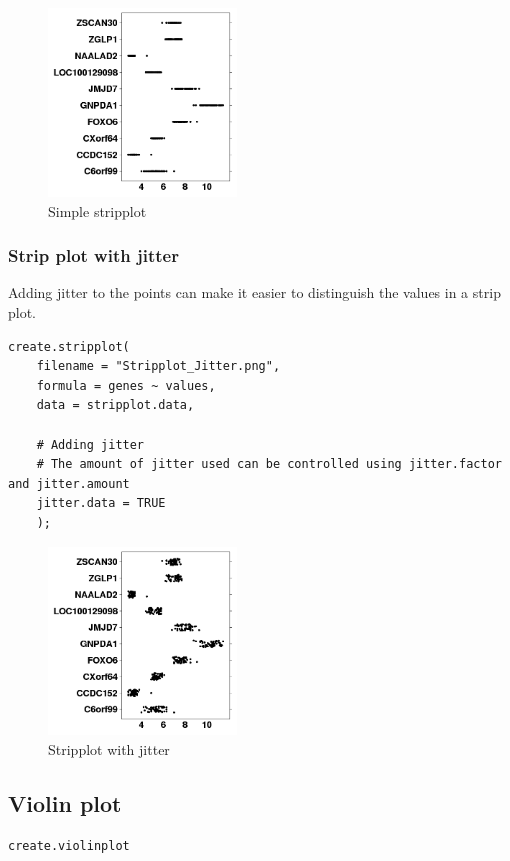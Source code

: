 \documentclass[letterpaper]{article}
\begin{document}
\begin{figure}[!ht]
  \begin{center}
	 \includegraphics[width=50mm]{Figures/Stripplot_Minimal_Input.png} 
    \caption{Simple stripplot}
  \end{center}
\end{figure}

\subsubsection{Strip plot with jitter}
Adding jitter to the points can make it easier to distinguish the values in a strip plot.
\begin{verbatim}
create.stripplot(
    filename = "Stripplot_Jitter.png",
    formula = genes ~ values,
    data = stripplot.data,
    
    # Adding jitter
    # The amount of jitter used can be controlled using jitter.factor and jitter.amount
    jitter.data = TRUE
    );
\end{verbatim}

\begin{figure}[!ht]
  \begin{center}
	 \includegraphics[width=50mm]{Figures/Stripplot_Jitter.png} 
    \caption{Stripplot with jitter}
  \end{center}
\end{figure}

\subsection{Violin plot}
\begin{verbatim}
create.violinplot
\end{verbatim}
\end{document}
